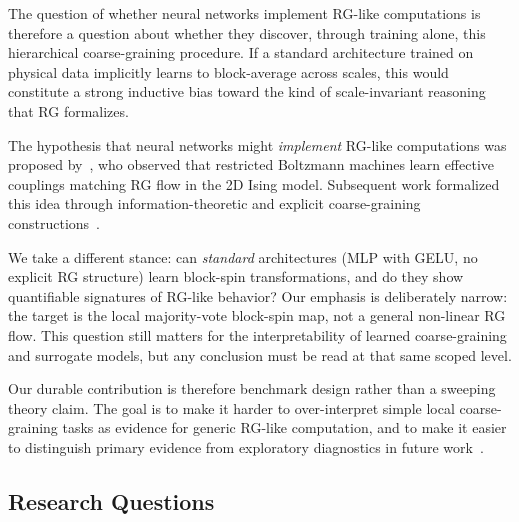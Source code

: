 \documentclass[12pt,a4paper]{memoir}
\begin{document}
The question of whether neural networks implement RG-like
computations is therefore a question about whether they discover, through
training alone, this hierarchical coarse-graining procedure.  If a standard
architecture trained on physical data implicitly learns to block-average
across scales, this would constitute a strong inductive bias toward the kind
of scale-invariant reasoning that RG formalizes.

The hypothesis that neural networks might \emph{implement} RG-like computations
was proposed by~\citep{mehta2014renormalization}, who observed that restricted
Boltzmann machines learn effective couplings matching RG flow in the 2D Ising
model.  Subsequent work formalized this idea through information-theoretic and
explicit coarse-graining constructions~\citep{kochlug,li2018neuralrg,
pang2020neural,hu2020holographic,bachtis2021}.

We take a different stance: can \emph{standard} architectures (MLP with GELU,
no explicit RG structure) learn block-spin transformations, and do they show
quantifiable signatures of RG-like behavior?  Our emphasis is deliberately
narrow: the target is the local majority-vote block-spin map, not a general
non-linear RG flow.  This question still matters for the interpretability of
learned coarse-graining and surrogate models, but any conclusion must be read
at that same scoped level.

Our durable contribution is therefore benchmark design rather than a sweeping
theory claim.  The goal is to make it harder to over-interpret simple local
coarse-graining tasks as evidence for generic RG-like computation, and to make
it easier to distinguish primary evidence from exploratory diagnostics in
future work~\citep{mehta2014renormalization,pang2020neural,li2018neuralrg,
kochlug}.

\subsection{Research Questions}
\end{document}
